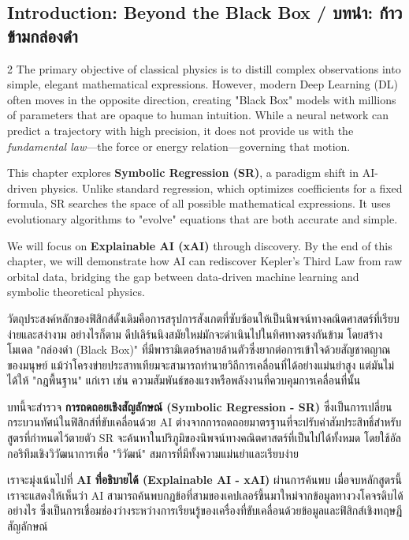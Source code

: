 \subsection{Introduction: Beyond the Black Box \quad / \quad \textthai{บทนำ: ก้าวข้ามกล่องดำ}}
\begin{paracol}{2}
The primary objective of classical physics is to distill complex observations into simple, elegant mathematical expressions. However, modern Deep Learning (DL) often moves in the opposite direction, creating "Black Box" models with millions of parameters that are opaque to human intuition. While a neural network can predict a trajectory with high precision, it does not provide us with the \textit{fundamental law}—the force or energy relation—governing that motion.

This chapter explores \textbf{Symbolic Regression (SR)}, a paradigm shift in AI-driven physics. Unlike standard regression, which optimizes coefficients for a fixed formula, SR searches the space of all possible mathematical expressions. It uses evolutionary algorithms to "evolve" equations that are both accurate and simple.

We will focus on \textbf{Explainable AI (xAI)} through discovery. By the end of this chapter, we will demonstrate how AI can rediscover Kepler's Third Law from raw orbital data, bridging the gap between data-driven machine learning and symbolic theoretical physics.

\switchcolumn

\begin{thai}
วัตถุประสงค์หลักของฟิสิกส์ดั้งเดิมคือการสรุปการสังเกตที่ซับซ้อนให้เป็นนิพจน์ทางคณิตศาสตร์ที่เรียบง่ายและสง่างาม อย่างไรก็ตาม ดีปเลิร์นนิงสมัยใหม่มักจะดำเนินไปในทิศทางตรงกันข้าม โดยสร้างโมเดล "กล่องดำ (Black Box)" ที่มีพารามิเตอร์หลายล้านตัวซึ่งยากต่อการเข้าใจด้วยสัญชาตญาณของมนุษย์ แม้ว่าโครงข่ายประสาทเทียมจะสามารถทำนายวิถีการเคลื่อนที่ได้อย่างแม่นยำสูง แต่มันไม่ได้ให้ "กฎพื้นฐาน" แก่เรา เช่น ความสัมพันธ์ของแรงหรือพลังงานที่ควบคุมการเคลื่อนที่นั้น

บทนี้จะสำรวจ \textbf{การถดถอยเชิงสัญลักษณ์ (Symbolic Regression - SR)} ซึ่งเป็นการเปลี่ยนกระบวนทัศน์ในฟิสิกส์ที่ขับเคลื่อนด้วย AI ต่างจากการถดถอยมาตรฐานที่จะปรับค่าสัมประสิทธิ์สำหรับสูตรที่กำหนดไว้ตายตัว SR จะค้นหาในปริภูมิของนิพจน์ทางคณิตศาสตร์ที่เป็นไปได้ทั้งหมด โดยใช้อัลกอริทึมเชิงวิวัฒนาการเพื่อ "วิวัฒน์" สมการที่มีทั้งความแม่นยำและเรียบง่าย

เราจะมุ่งเน้นไปที่ \textbf{AI ที่อธิบายได้ (Explainable AI - xAI)} ผ่านการค้นพบ เมื่อจบหลักสูตรนี้ เราจะแสดงให้เห็นว่า AI สามารถค้นพบกฎข้อที่สามของเคปเลอร์ขึ้นมาใหม่จากข้อมูลทางวงโคจรดิบได้อย่างไร ซึ่งเป็นการเชื่อมช่องว่างระหว่างการเรียนรู้ของเครื่องที่ขับเคลื่อนด้วยข้อมูลและฟิสิกส์เชิงทฤษฎีสัญลักษณ์
\end{thai}
\end{paracol}
